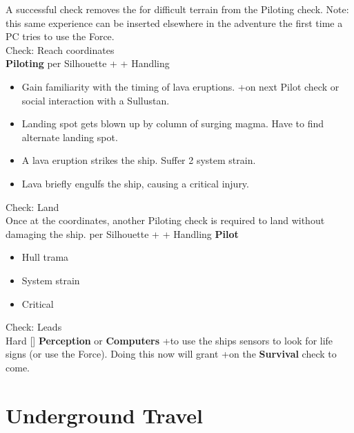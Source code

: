 \documentclass{book}
\newcommand{\df}{\difficulty}
\newcommand{\stb}{\setback}
\begin{document}
\begin{multicols*}{2}
A successful check removes the \setback\setback\setback for difficult terrain from the Piloting check.  Note: this same experience can be inserted elsewhere in the adventure the first time a PC tries to use the Force.\\
Check: Reach coordinates\\
\textbf{Piloting} \difficulty per Silhouette + \stb\stb\stb + Handling 

\begin{itemize}
	\item \advantage Gain familiarity with the timing of lava eruptions.  +\boost on next Pilot check or social interaction with a Sullustan.
	\item \failure Landing spot gets blown up by column of surging magma. Have to find alternate landing spot.
	\item \threat \threat A lava eruption strikes the ship.  Suffer 2 system strain.
	\item \despair Lava briefly engulfs the ship, causing a critical injury.
\end{itemize}
Check: Land\\
Once at the coordinates, another Piloting check is required to land without damaging the ship.
\difficulty per Silhouette + \stb\stb + Handling \textbf{Pilot}
\begin{itemize}
    \item \failure Hull trama
    \item \threat System strain
	\item \despair Critical
\end{itemize}
Check: Leads\\
Hard [\df\df\df] \textbf{Perception} or \textbf{Computers} +\setback to use the ships sensors to look for life signs (or use the Force). Doing this now will grant +\boost on the \textbf{Survival} check to come.

\section{Underground Travel}


\end{multicols*}
\end{document}
